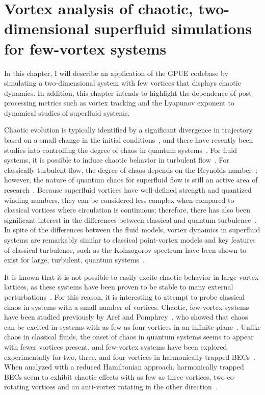 \chapter{Vortex analysis of chaotic, two-dimensional superfluid simulations for few-vortex systems}
\label{ch:2d}

In this chapter, I will describe an application of the GPUE codebase by simulating a two-dimensional system with few vortices that displays chaotic dynamics.
In addition, this chapter intends to highlight the dependence of post-processing metrics such as vortex tracking and the Lyapunov exponent to dynamical studies of superfluid systems.

Chaotic evolution is typically identified by a significant divergence in trajectory based on a small change in the initial conditions~\cite{strogatz2018}, and there have recently been studies into controlling the degree of chaos in quantum systems~\cite{eastman2017, eastman2019}.
For fluid systems, it is possible to induce chaotic behavior in turbulent flow~\cite{spiegel1987, biferale2005}.
For classically turbulent flow, the degree of chaos depends on the Reynolds number~\cite{berera2018}; however, the nature of quantum chaos for superfluid flow is still an active area of research~\cite{white2014}.
Because superfluid vortices have well-defined strength and quantized winding numbers, they can be considered less complex when compared to classical vortices where circulation is continuous; therefore, there has also been significant interest in the differences between classical and quantum turbulence~\cite{nemirovskii1995,kyriakopoulos2014,koukouloyannis2014,navarro2013}.
In spite of the differences between the fluid models, vortex dynamics in superfluid systems are remarkably similar to classical point-vortex models and key features of classical turbulence, such as the Kolmogorov spectrum have been shown to exist for large, turbulent, quantum systems~\cite{nore1997,stalp1999,araki2002,salort2010}.

It is known that it is not possible to easily excite chaotic behavior in large vortex lattices, as these systems have been proven to be stable to many external perturbations~\cite{o2017}.
For this reason, it is interesting to attempt to probe classical chaos in systems with a small number of vortices.
Chaotic, few-vortex systems have been studied previously by Aref and Pomphrey~\cite{aref1982, aref1980, aref1983}, who showed that chaos can be excited in systems with as few as four vortices in an infinite plane~\cite{aref1982}.
Unlike chaos in classical fluids, the onset of chaos in quantum systems seems to appear with fewer vortices present, and few-vortex systems have been explored experimentally for two, three, and four vortices in harmonically trapped BECs~\cite{navarro2013}.
When analyzed with a reduced Hamiltonian approach, harmonically trapped BECs seem to exhibit chaotic effects with as few as three vortices, two co-rotating vortices and an anti-vortex rotating in the other direction~\cite{kyriakopoulos2014,koukouloyannis2014}.

